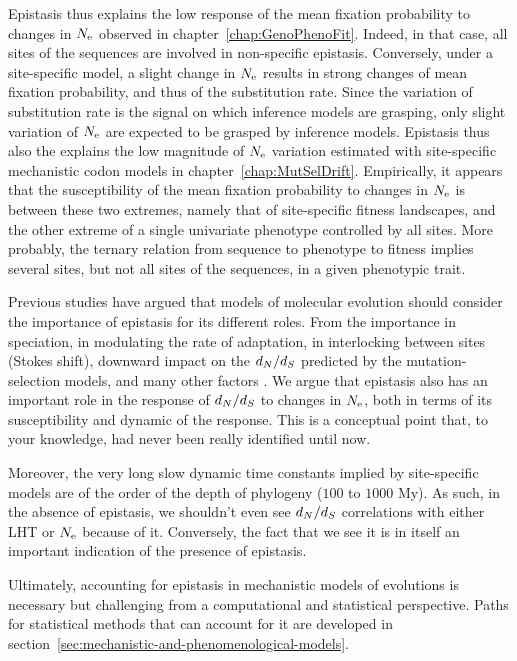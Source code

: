 Epistasis thus explains the low response of the mean fixation probability to changes in $N_{\textrm{e}}$ observed in chapter~\ref{chap:GenoPhenoFit}.
Indeed, in that case, all sites of the sequences are involved in non-specific epistasis.
Conversely, under a site-specific model, a slight change in $N_{\textrm{e}}$ results in strong changes of mean fixation probability, and thus of the substitution rate.
Since the variation of substitution rate is the signal on which inference models are grasping, only slight variation of $N_{\textrm{e}}$ are expected to be grasped by inference models.
Epistasis thus also the explains the low magnitude of $N_{\textrm{e}}$ variation estimated with site-specific mechanistic codon models in chapter~\ref{chap:MutSelDrift}.
Empirically, it appears that the susceptibility of the mean fixation probability to changes in $N_{\textrm{e}}$ is between these two extremes, namely that of site-specific fitness landscapes, and the other extreme of a single univariate phenotype controlled by all sites.
More probably, the ternary relation from sequence to phenotype to fitness implies several sites, but not all sites of the sequences, in a given phenotypic trait.

Previous studies have argued that models of molecular evolution should consider the importance of epistasis for its different roles.
From the importance in speciation, in modulating the rate of adaptation, in interlocking between sites (Stokes shift), downward impact on the $d_N / d_S$ predicted by the mutation-selection models, and many other factors \citet{Goldstein2017, Miller2018}.
We argue that epistasis also has an important role in the response of $d_N / d_S$ to changes in $N_{\textrm{e}}$, both in terms of its susceptibility and dynamic of the response.
This is a conceptual point that, to your knowledge, had never been really identified until now.

Moreover, the very long slow dynamic time constants implied by site-specific models are of the order of the depth of phylogeny ($100$ to $1000$ My).
As such, in the absence of epistasis, we shouldn't even see $d_N / d_S$ correlations with either \acrshort{LHT} or $N_{\textrm{e}}$ because of it.
Conversely, the fact that we see it is in itself an important indication of the presence of epistasis.

Ultimately, accounting for epistasis in mechanistic models of evolutions is necessary but challenging from a computational and statistical perspective.
Paths for statistical methods that can account for it are developed in section~\ref{sec:mechanistic-and-phenomenological-models}.


